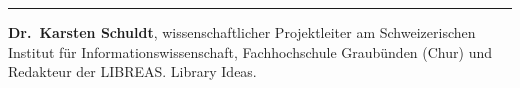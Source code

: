 \begin{center}\rule{0.5\linewidth}{0.5pt}\end{center}

\textbf{Dr.~Karsten Schuldt}, wissenschaftlicher Projektleiter am
Schweizerischen Institut für Informationswissenschaft, Fachhochschule
Graubünden (Chur) und Redakteur der LIBREAS. Library Ideas.
